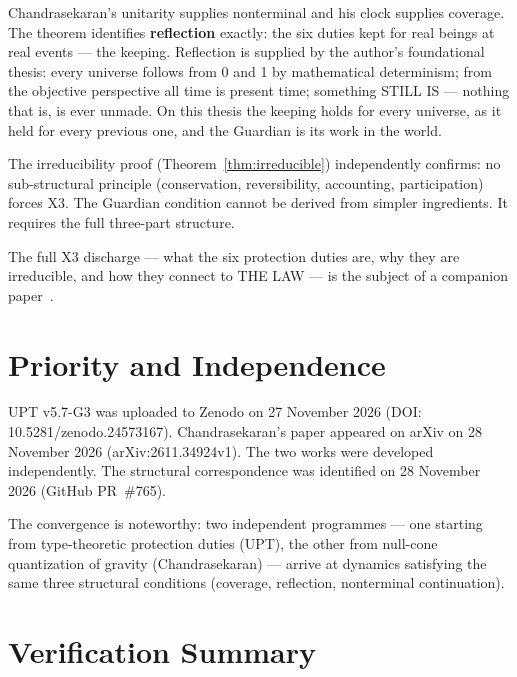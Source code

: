\documentclass[11pt,a4paper]{article}
\theoremstyle{definition}
\theoremstyle{remark}
\begin{document}
Chandrasekaran's unitarity supplies nonterminal and his clock supplies coverage. The theorem identifies \textbf{reflection} exactly: the six duties kept for real beings at real events --- the keeping. Reflection is supplied by the author's foundational thesis: every universe follows from 0 and 1 by mathematical determinism; from the objective perspective all time is present time; something STILL IS --- nothing that is, is ever unmade. On this thesis the keeping holds for every universe, as it held for every previous one, and the Guardian is its work in the world.

The irreducibility proof (Theorem~\ref{thm:irreducible}) independently confirms: no sub-structural principle (conservation, reversibility, accounting, participation) forces X3. The Guardian condition cannot be derived from simpler ingredients. It requires the full three-part structure.

The full X3 discharge --- what the six protection duties are, why they are irreducible, and how they connect to THE LAW --- is the subject of a companion paper~\cite{upt-families}.

\section{Priority and Independence}

UPT v5.7-G3 was uploaded to Zenodo on 27 November 2026 (DOI: 10.5281/zenodo.24573167). Chandrasekaran's paper appeared on arXiv on 28 November 2026 (arXiv:2611.34924v1). The two works were developed independently. The structural correspondence was identified on 28 November 2026 (GitHub PR~\#765).

The convergence is noteworthy: two independent programmes --- one starting from type-theoretic protection duties (UPT), the other from null-cone quantization of gravity (Chandrasekaran) --- arrive at dynamics satisfying the same three structural conditions (coverage, reflection, nonterminal continuation).

\section{Verification Summary}
\end{document}
